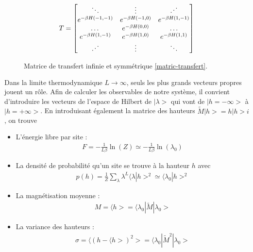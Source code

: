 \begin{figure}
    \begin{align}
    T = \begin{bmatrix} 
            \ddots & \vdots & \reflectbox{$\ddots$} \\ 
            e^{-\beta H(-1,-1)} &  e^{-\beta H(-1,0)} & e^{-\beta H(1,-1)} \\
            \dots & e^{-\beta H(0,0)} & \dots  \\
            e^{-\beta H(1,-1)} & e^{-\beta H(1,0)} & e^{-\beta H(1,1)}   \\ 
             \reflectbox{$\ddots$} & \vdots &\ddots  \\ 
        \end{bmatrix}
    \end{align}
    \caption{Matrice de transfert infinie et symmétrique \ref{matric-transfert}.}
\end{figure}

Dans la limite thermodynamique $L \to \infty$, seuls les plus grands vecteurs propres jouent un rôle. Afin de calculer les observables de notre système, il convient d'introduire les vecteurs de l'espace de Hilbert de ${|\lambda>}$ qui vont de $|h = -\infty>$ à $|h = +\infty>$.
En introduisant également la matrice des hauteurs $\tilde{M} |h> = h |h> i$, on trouve
\begin{itemize}
	\item L'énergie libre par site :  
	\begin{align}
		F =  - \frac{1}{L \beta} \ln(Z) \simeq - \frac{1}{L \beta } \ln( \lambda_0)
	\end{align}
	\item La densité de probabilité qu'un site se trouve à la hauteur $h$ avec
	\begin{align}
		p(h) = \frac{1}{Z} \sum_\lambda \lambda^L \langle\lambda | h >^2 \simeq \langle \lambda_0 | h >^2
	\end{align}
	\item La magnétisation moyenne :
	\begin{align}
		M = \langle h > = \langle \lambda_0 | \tilde{M} | \lambda_0 > 
	\end{align}
	\item La variance des hauteurs :
	\begin{align}
		\sigma = \langle (h - \langle h >)^2 > =  \langle \lambda_0 | \tilde{M}^2 | \lambda_0 >
	\end{align}
\end{itemize}

